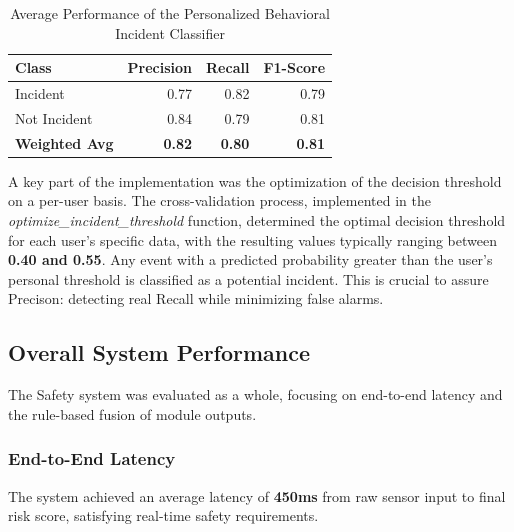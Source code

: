 \documentclass[12pt,a4paper,oneside,english]{book}
\begin{document}
\begin{table}[h!]
    \centering
    \caption{Average Performance of the Personalized Behavioral Incident Classifier}
    \label{tab:behavioral_results}
    \begin{tabular}{lrrr}
        \hline
        \textbf{Class} & \textbf{Precision} & \textbf{Recall} & \textbf{F1-Score} \\ \hline
        Incident       & 0.77               & 0.82            & 0.79              \\
        Not Incident   & 0.84               & 0.79            & 0.81              \\ \hline
        \textbf{Weighted Avg} & \textbf{0.82} & \textbf{0.80} & \textbf{0.81} \\ \hline
    \end{tabular}
\end{table}

A key part of the implementation was the optimization of the decision threshold on a per-user basis. The cross-validation process, 
implemented in the \textit{optimize\_incident\_threshold} function, determined the optimal decision threshold for each user's specific data, 
with the resulting values typically ranging between \textbf{0.40 and 0.55}. Any event with a predicted probability greater than the user's 
personal threshold is classified as a potential incident. This is crucial to assure Precison: detecting real Recall while minimizing false alarms.


    \subsection{Overall System Performance}
\label{subsec:overall_results}

The Safety system was evaluated as a whole, focusing on end-to-end latency and the rule-based fusion of module outputs.

\subsubsection{End-to-End Latency}
The system achieved an average latency of \textbf{450ms} from raw sensor input to final risk score, satisfying real-time safety requirements.
\end{document}

